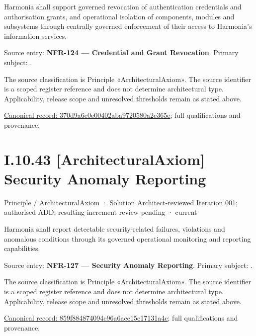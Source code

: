 Harmonia shall support governed revocation of authentication credentials and authorisation grants, and operational isolation of components, modules and subsystems through centrally governed enforcement of their access to Harmonia's information services.



Source entry: \textbf{NFR-124 — Credential and Grant Revocation}. Primary subject: \texttt{}.



The source classification is Principle «ArchitecturalAxiom». The source identifier is a scoped register reference and does not determine architectural type. Applicability, release scope and unresolved thresholds remain as stated above.


{\footnotesize \href{../../../../../../../../continuum/motivation/principle/architectural-axiom/370d9a6e0e00402aba9720580a2e365e.md}{Canonical record: 370d9a6e0e00402aba9720580a2e365e}; full qualifications and provenance.}\par
\section*{I.10.43 [ArchitecturalAxiom] Security Anomaly Reporting}
\label{navigation:I.10.43}

\label{element:859f884874094c96a6ace15e17131a4c}
{\small Principle / ArchitecturalAxiom · Solution Architect-reviewed Iteration 001; authorised ADD; resulting increment review pending · current}\par

Harmonia shall report detectable security-related failures, violations and anomalous conditions through its governed operational monitoring and reporting capabilities.



Source entry: \textbf{NFR-127 — Security Anomaly Reporting}. Primary subject: \texttt{}.



The source classification is Principle «ArchitecturalAxiom». The source identifier is a scoped register reference and does not determine architectural type. Applicability, release scope and unresolved thresholds remain as stated above.


{\footnotesize \href{../../../../../../../../continuum/motivation/principle/architectural-axiom/859f884874094c96a6ace15e17131a4c.md}{Canonical record: 859f884874094c96a6ace15e17131a4c}; full qualifications and provenance.}\par
